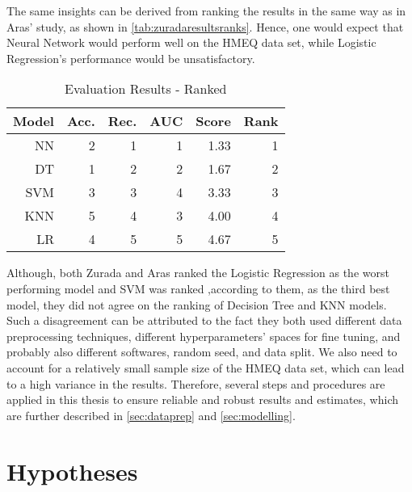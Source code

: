 The same insights can be derived from ranking the results in the same way as in Aras' study, as shown in \autoref{tab:zuradaresultsranks}.
Hence, one would expect that Neural Network would perform well on the HMEQ data set, while Logistic Regression's performance would be unsatisfactory.
\begin{table}[H]
    \small
    \setlength{\tabcolsep}{8pt}
    \renewcommand{\arraystretch}{1.3}
    \centering
    \caption[Evaluation Results - Ranked \citep{zurada2014classification}]{Evaluation Results - Ranked \citep{zurada2014classification}}\label{tab:zuradaresultsranks}
    \begin{tabular}{r r r r r r}
    \toprule
    \textbf{Model} & \textbf{Acc.} & \textbf{Rec.} & \textbf{AUC} & \textbf{Score} & \textbf{Rank} \\
    \midrule
    \hline
    NN & 2 & 1 & 1 & 1.33 & 1 \\ 
    DT & 1 & 2 & 2 & 1.67 & 2 \\ 
    SVM & 3 & 3 & 4 & 3.33 & 3 \\ 
    KNN & 5 & 4 & 3 & 4.00 & 4 \\ 
    LR & 4 & 5 & 5 & 4.67 & 5 \\ 
    \hline
    \bottomrule
    \end{tabular}
    \vspace{0.35em}
    
    \vspace{-1em}
\end{table}

Although, both Zurada and Aras ranked the Logistic Regression as the worst performing model and SVM was ranked ,according to them, as the third best model, they did not agree on the ranking of Decision Tree and KNN models.
Such a disagreement can be attributed to the fact they both used different data preprocessing techniques, different hyperparameters' spaces for fine tuning, and probably also different softwares, random seed, and data split.
We also need to account for a relatively small sample size of the HMEQ data set, which can lead to a high variance in the results.
Therefore, several steps and procedures are applied in this thesis to ensure reliable and robust results and estimates, which are further described in \autoref{sec:dataprep} and \autoref{sec:modelling}.


\section{Hypotheses}
\label{sec:hypo}

